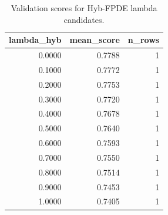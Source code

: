\begin{table}[t]
\caption{Validation scores for Hyb-FPDE lambda candidates.}
\label{tab:lambda_distribution_computed}
\centering
\begin{tabular}{rrr}
\toprule
lambda\_hyb & mean\_score & n\_rows \\
\midrule
0.0000 & 0.7788 & 1 \\
0.1000 & 0.7772 & 1 \\
0.2000 & 0.7753 & 1 \\
0.3000 & 0.7720 & 1 \\
0.4000 & 0.7678 & 1 \\
0.5000 & 0.7640 & 1 \\
0.6000 & 0.7593 & 1 \\
0.7000 & 0.7550 & 1 \\
0.8000 & 0.7514 & 1 \\
0.9000 & 0.7453 & 1 \\
1.0000 & 0.7405 & 1 \\
\bottomrule
\end{tabular}

\end{table}

